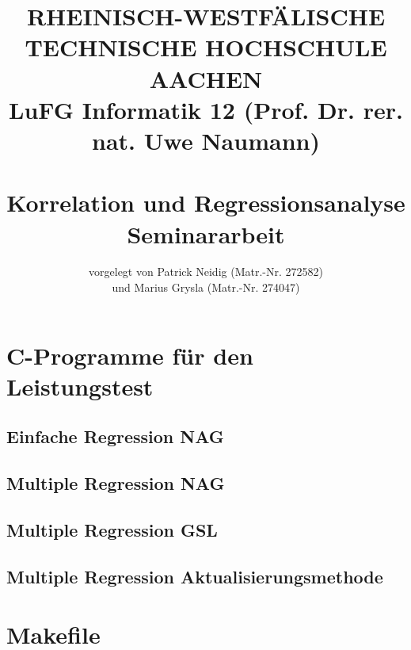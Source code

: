 \documentclass{article}
\title{
{\bf \scriptsize RHEINISCH-WESTF\"ALISCHE TECHNISCHE HOCHSCHULE AACHEN \\
LuFG Informatik 12 (Prof. Dr. rer. nat. Uwe Naumann)}
\vspace{.5cm} \\
\epsfig{file=figures/STCE_Logo_WWW.eps,width=.7\textwidth}
\vspace{1cm} \\
{\bf \Large Korrelation und Regressionsanalyse} \\
{\large Seminararbeit} 
}
\author{vorgelegt von Patrick Neidig (Matr.-Nr. 272582)\\
	und Marius Grysla (Matr.-Nr. 274047)}
\begin{document}


\pagestyle{headings}

\maketitle

\newpage
\tableofcontents

\newpage














\appendix

\lstset{basicstyle=\tiny, numberstyle=\tiny}

\section{C-Programme für den Leistungstest}

\subsection{Einfache Regression NAG}


\subsection{Multiple Regression NAG}


\subsection{Multiple Regression GSL}


\subsection{Multiple Regression Aktualisierungsmethode}


\section{Makefile}

\end{document}
